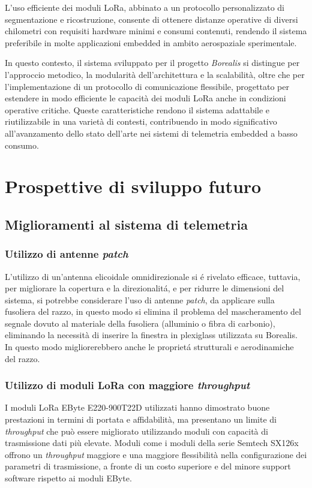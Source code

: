 \documentclass[12pt,a4paper,twoside]{book}
\begin{document}
L’uso efficiente dei moduli \ac{LoRa}, abbinato a un protocollo
personalizzato di segmentazione e ricostruzione, consente di ottenere distanze
operative di diversi chilometri con requisiti hardware minimi e consumi contenuti,
rendendo il sistema preferibile in molte applicazioni embedded in ambito aerospaziale
sperimentale.

In questo contesto, il sistema sviluppato per il progetto \emph{Borealis} si
distingue per l’approccio metodico, la modularità dell’architettura e la scalabilità,
oltre che per l’implementazione di un protocollo di comunicazione flessibile,
progettato per estendere in modo efficiente le capacità dei moduli \ac{LoRa}
anche in condizioni operative critiche.
Queste caratteristiche rendono il sistema adattabile e riutilizzabile in una
varietà di contesti, contribuendo in modo significativo all’avanzamento dello stato
dell’arte nei sistemi di telemetria embedded a basso consumo.

\section{Prospettive di sviluppo futuro}
\subsection{Miglioramenti al sistema di telemetria}
\subsubsection{Utilizzo di antenne \emph{patch}}
L'utilizzo di un'antenna elicoidale omnidirezionale si \'e rivelato efficace, tuttavia,
per migliorare la copertura e la direzionalit\'a, e per ridurre le dimensioni del sistema,
si potrebbe considerare l'uso di antenne \emph{patch}, da applicare sulla fusoliera del razzo,
in questo modo si elimina il problema del mascheramento del segnale dovuto al materiale della fusoliera
(alluminio o fibra di carbonio), eliminando la necessità di inserire la finestra in plexiglass utilizzata
su Borealis. In questo modo migliorerebbero anche le propriet\'a strutturali e aerodinamiche del razzo.
\subsubsection{Utilizzo di moduli \ac{LoRa} con maggiore \emph{throughput}}
I moduli \ac{LoRa} EByte E220-900T22D utilizzati hanno dimostrato buone prestazioni
in termini di portata e affidabilità, ma presentano un limite di \emph{throughput} che
può essere migliorato utilizzando moduli con capacità di trasmissione dati più elevate.
Moduli come i moduli della serie Semtech SX126x offrono un \emph{throughput} maggiore e
una maggiore flessibilità nella configurazione dei parametri di trasmissione, a fronte
di un costo superiore e del minore support software rispetto ai moduli EByte.
\end{document}
